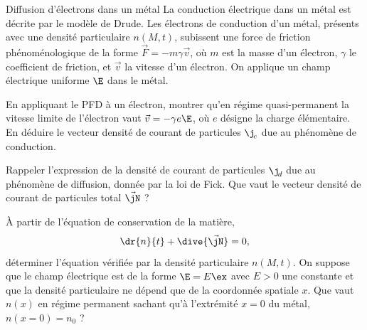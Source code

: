 \begin{exo}[PC][1][colle]{Diffusion d'électrons dans un métal}
  La conduction électrique dans un métal est décrite par le modèle de Drude. Les électrons de conduction d'un métal, présents avec une densité particulaire $n(M,t)$, subissent une force de friction phénoménologique de la forme $\Vec{F} = -m\gamma \Vec{v}$, où $m$ est la masse d'un électron, $\gamma$ le coefficient de friction, et $\Vec{v}$ la vitesse d'un électron. On applique un champ électrique uniforme $\E$ dans le métal.
  \begin{quest}
    \item	En appliquant le PFD à un électron, montrer qu'en régime quasi-permanent la vitesse limite de l'électron vaut $\Vec{v} = -\gamma e  \E$, où $e$ désigne la charge élémentaire. En déduire le vecteur densité de courant de particules $\j_{\!c}$ due au phénomène de conduction.
    \item Rappeler l'expression de la densité de courant de particules $\j_{\!d}$ due au phénomène de diffusion, donnée par la loi de Fick. Que vaut le vecteur densité de courant de particules total $\Vec{\jN}$ ?
    \item À partir de l'équation de conservation de la matière, 
    $$
    \dr{n}{t} + \dive{\Vec{\jN}} =0,
    $$
    déterminer l'équation vérifiée par la densité particulaire $n(M,t)$. On suppose que le champ électrique est de la forme $\E = E \ex$ avec $E>0$ une constante et que la densité particulaire ne dépend que de la coordonnée spatiale $x$. Que vaut $n(x)$ en régime permanent sachant qu'à l'extrémité $x=0$ du métal, $n(x=0)=n_0$ ?
  \end{quest}

\end{exo}


